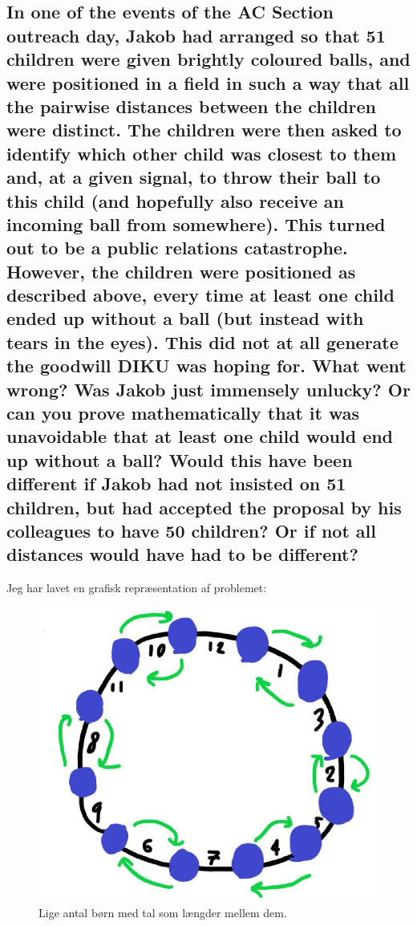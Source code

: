 \documentclass[a4paper,12pt]{article}
\begin{document}
\subsection[]{In one of the events of the AC Section outreach day, Jakob had arranged so that 51 children were given brightly coloured balls, and were positioned in a field in such a way that all the pairwise distances between the children were distinct. The children were then asked to identify which other child was closest to them and, at a given signal, to throw their ball to this child (and hopefully also receive an incoming ball from somewhere). This turned out to be a public relations catastrophe. However, the children were positioned as described above, every time at least one child ended up without a ball (but instead with tears in the eyes). This did not at all generate the goodwill DIKU was hoping for. What went wrong? Was Jakob just immensely unlucky? Or can you prove mathematically that it was unavoidable that at least one child would end up without a ball? Would this have been different if Jakob had not insisted on 51 children, but had accepted the proposal by his colleagues to have 50 children? Or if not all distances would have had to be different?}

Jeg har lavet en grafisk repræsentation af problemet:

\begin{figure}[H]
    \centering
    \includegraphics[scale=0.5]{even.jpg}
    \caption{Lige antal børn med tal som længder mellem dem.}
\end{figure}
\end{document}
